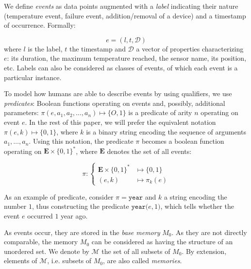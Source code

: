 \documentclass[entropy,article,submit,moreauthors,pdftex]{Definitions/mdpi}
\begin{document}
We define \emph{events} as data points augmented with a \emph{label} indicating their nature (temperature event, failure event, addition/removal of a device) and a timestamp of occurrence. Formally:

\begin{equation}
    \label{eq:event}
    e = (l, t,\mathcal{D})
\end{equation}
where $l$ is the label, $t$ the timestamp and $\mathcal{D}$ a vector of properties characterizing $e$: its duration, the maximum temperature reached, the sensor name, its position, etc. Labels can also be considered as classes of events, of which each event is a particular instance.

To model how humans are able to describe events by using qualifiers, we use \emph{predicates}: Boolean functions operating on events and, possibly, additional parameters: $\pi(e, a_1, a_2, \dots, a_n) \mapsto \{O,1\}$ is a predicate of arity $n$ operating on event $e$. In the rest of this paper, we will prefer the equivalent notation $\pi(e, k) \mapsto \{0,1\}$, where $k$ is a binary string encoding the sequence of arguments $a_1, \dots, a_n$. Using this notation, the predicate $\pi$ becomes a boolean function operating on $\mathbf{E} \times \{0,1\}^*$, where $\mathbf{E}$ denotes the set of all events:

\begin{equation}
    \label{eq:predicate}
    \pi : \begin{cases}
        \mathbf{E}\times \{0,1\}^{*} & \mapsto \{0,1\}    \\
        (e, k)                        & \mapsto \pi_{k}(e)
    \end{cases}
\end{equation}

As an example of predicate, consider $\pi = \mathtt{year}$ and $k$ a string encoding the number $1$, thus
constructing the predicate $\mathtt{year(}e, 1\mathtt{)}$, which tells whether
the event $e$ occurred $1$ year ago.

As events occur, they are stored in the  \emph{base memory} $M_0$. As they are not directly comparable, the memory $M_0$ can be considered as having the structure of an unordered set. We denote by $\mathcal{M}$ the set of all subsets of $M_0$. By extension, elements of $\mathcal{M}$, i.e. subsets of $M_0$, are also called \emph{memories}.
\end{document}
